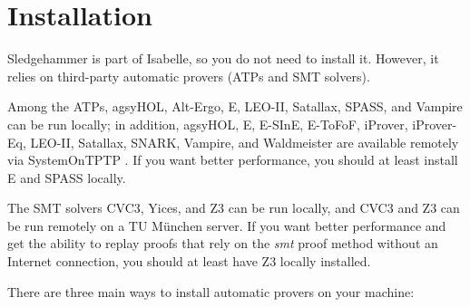 \documentclass[a4paper,12pt]{article}
\begin{document}
%

\section{Installation}
\label{installation}

Sledgehammer is part of Isabelle, so you do not need to install it. However, it
relies on third-party automatic provers (ATPs and SMT solvers).

Among the ATPs, agsyHOL, Alt-Ergo, E, LEO-II, Satallax, SPASS, and Vampire can
be run locally; in addition, agsyHOL, E, E-SInE, E-ToFoF, iProver, iProver-Eq,
LEO-II, Satallax, SNARK, Vampire, and Waldmeister are available remotely via
System\-On\-TPTP \cite{sutcliffe-2000}. If you want better performance, you
should at least install E and SPASS locally.

The SMT solvers CVC3, Yices, and Z3 can be run locally, and CVC3 and
Z3 can be run remotely on a TU M\"unchen server. If you want better performance
and get the ability to replay proofs that rely on the \emph{smt} proof method
without an Internet connection, you should at least have Z3 locally installed.

There are three main ways to install automatic provers on your machine:
\end{document}
